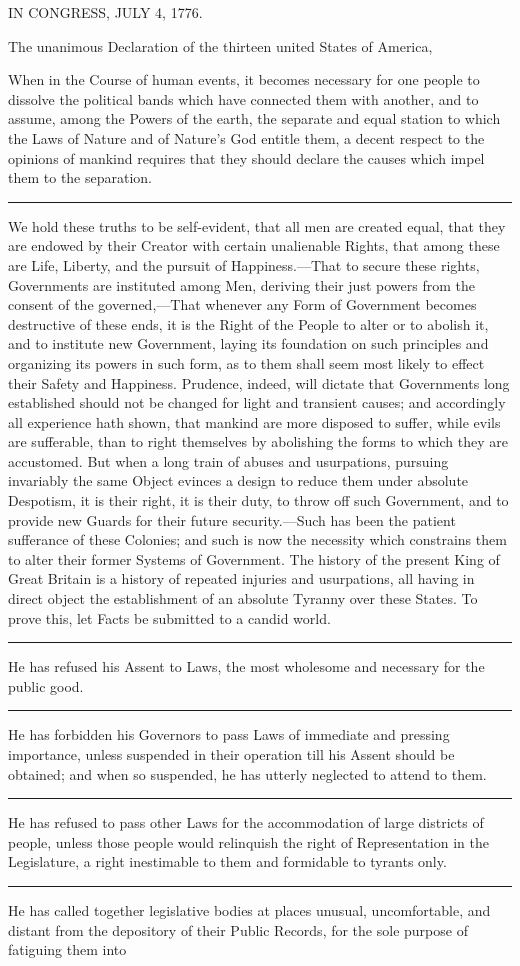 \documentclass{article}
\begin{document}
\begin{center}
\Huge{}I\huge{}N \Huge CONGRESS, J\huge{}ULY \Huge 4, 1776.
\end{center}

 \LARGE The unanimous Declaration \normalsize of the thirteen united \LARGE States of America,

\large When \normalsize \rmfamily in the Course of human events, it becomes necessary for one people to dissolve the political bands which have connected them with another, and to assume, among the Powers of the earth, the separate and equal station to which the Laws of Nature and of Nature's God entitle them, a decent respect to the opinions of mankind requires that they should declare the causes which impel them to the separation.\rule[.5ex]{4em}{.2pt}We hold these truths to be self-evident, that all men are created equal, that they are endowed by their Creator with certain unalienable Rights, that among these are Life, Liberty, and the pursuit of Happiness.---That to secure these rights, Governments are instituted among Men, deriving their just powers from the consent of the governed,---That whenever any Form of Government becomes destructive of these ends, it is the Right of the People to alter or to abolish it, and to institute new Government, laying its foundation on such principles and organizing its powers in such form, as to them shall seem most likely to effect their Safety and Happiness. Prudence, indeed, will dictate that Governments long established should not be changed for light and transient causes; and accordingly all experience hath shown, that mankind are more disposed to suffer, while evils are sufferable, than to right themselves by abolishing the forms to which they are accustomed. But when a long train of abuses and usurpations, pursuing invariably the same Object evinces a design to reduce them under absolute Despotism, it is their right, it is their duty, to throw off such Government, and to provide new Guards for their future security.---Such has been the patient sufferance of these Colonies; and such is now the necessity which constrains them to alter their former Systems of Government. The history of the present King of Great Britain is a history of repeated injuries and usurpations, all having in direct object the establishment of an absolute Tyranny over these States. To prove this, let Facts be submitted to a candid world.\rule[.5ex]{3em}{.2pt}He has refused his Assent to Laws, the most wholesome and necessary for the public good.\rule[.5ex]{2em}{.2pt}He has forbidden his Governors to pass Laws of immediate and pressing importance, unless suspended in their operation till his Assent should be obtained; and when so suspended, he has utterly neglected to attend to them.\rule[.5ex]{2em}{.2pt}He has refused to pass other Laws for the accommodation of large districts of people, unless those people would relinquish the right of Representation in the Legislature, a right inestimable to them and formidable to tyrants only.\rule[.5ex]{2em}{.2pt}He has called together legislative bodies at places unusual, uncomfortable, and distant from the depository of their Public Records, for the sole purpose of fatiguing them into 
\end{document}
